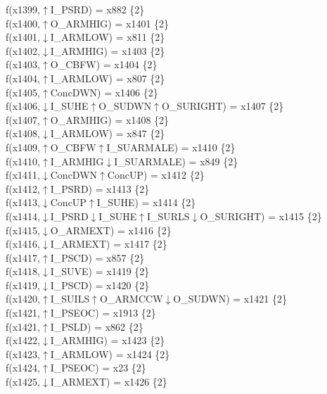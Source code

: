 f(x1399,$\uparrow$I\_PSRD) = x882 \{2\} \\  
f(x1400,$\uparrow$O\_ARMHIG) = x1401 \{2\} \\  
f(x1401,$\downarrow$I\_ARMLOW) = x811 \{2\} \\  
f(x1402,$\downarrow$I\_ARMHIG) = x1403 \{2\} \\  
f(x1403,$\uparrow$O\_CBFW) = x1404 \{2\} \\  
f(x1404,$\uparrow$I\_ARMLOW) = x807 \{2\} \\  
f(x1405,$\uparrow$ConcDWN) = x1406 \{2\} \\  
f(x1406,$\downarrow$I\_SUHE$\uparrow$O\_SUDWN$\uparrow$O\_SURIGHT) = x1407 \{2\} \\  
f(x1407,$\uparrow$O\_ARMHIG) = x1408 \{2\} \\  
f(x1408,$\downarrow$I\_ARMLOW) = x847 \{2\} \\  
f(x1409,$\uparrow$O\_CBFW$\uparrow$I\_SUARMALE) = x1410 \{2\} \\  
f(x1410,$\uparrow$I\_ARMHIG$\downarrow$I\_SUARMALE) = x849 \{2\} \\  
f(x1411,$\downarrow$ConcDWN$\uparrow$ConcUP) = x1412 \{2\} \\  
f(x1412,$\uparrow$I\_PSRD) = x1413 \{2\} \\  
f(x1413,$\downarrow$ConcUP$\uparrow$I\_SUHE) = x1414 \{2\} \\  
f(x1414,$\downarrow$I\_PSRD$\downarrow$I\_SUHE$\uparrow$I\_SURLS$\downarrow$O\_SURIGHT) = x1415 \{2\} \\  
f(x1415,$\downarrow$O\_ARMEXT) = x1416 \{2\} \\  
f(x1416,$\downarrow$I\_ARMEXT) = x1417 \{2\} \\  
f(x1417,$\uparrow$I\_PSCD) = x857 \{2\} \\  
f(x1418,$\downarrow$I\_SUVE) = x1419 \{2\} \\  
f(x1419,$\downarrow$I\_PSCD) = x1420 \{2\} \\  
f(x1420,$\uparrow$I\_SUILS$\uparrow$O\_ARMCCW$\downarrow$O\_SUDWN) = x1421 \{2\} \\  
f(x1421,$\uparrow$I\_PSEOC) = x1913 \{2\} \\  
f(x1421,$\uparrow$I\_PSLD) = x862 \{2\} \\  
f(x1422,$\downarrow$I\_ARMHIG) = x1423 \{2\} \\  
f(x1423,$\uparrow$I\_ARMLOW) = x1424 \{2\} \\  
f(x1424,$\uparrow$I\_PSEOC) = x23 \{2\} \\  
f(x1425,$\downarrow$I\_ARMEXT) = x1426 \{2\} \\  
